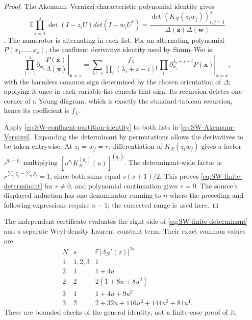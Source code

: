 \begin{proof}
The Akemann--Vernizzi characteristic-polynomial identity gives
\begin{equation}
 \mathbb E\prod_{i=1}^{s}\det(I-z_iU)det(I-w_iU^*)
 =\frac{\det(K_N(z_iw_j))_{i,j=1}^{s}}
 {\Delta(\mathbf z)\Delta(\mathbf w)}
 \label{eq:SW-Akemann-Vernizzi}
\end{equation}
\cite[Thm.~1]{akemannVernizzi2003}.  The numerator is alternating in each list.  For an
alternating polynomial $P(x_1,\ldots,x_s)$, the confluent derivative identity used by
Simm--Wei is
\begin{equation}
 \left.\prod_{i=1}^{s}\partial_{x_i}\frac{P(\mathbf x)}{\Delta(\mathbf x)}
 \right|_{\mathbf x=x}
 =\sum_{\lambda\vdash s}
 \frac{f_\lambda}{\prod_i(\lambda_i+s-i)!}
 \left.\prod_i\partial_{x_i}^{\lambda_i+s-i}P(\mathbf x)\right|_{\mathbf x=x},
 \label{eq:SW-confluent-partition-identity}
\end{equation}
with the harmless common sign determined by the chosen orientation of $\Delta$; applying it
once in each variable list cancels that sign.  Its recursion deletes one corner of a Young
diagram, which is exactly the standard-tableau recursion, hence its coefficient is
$f_\lambda$.

Apply \eqref{eq:SW-confluent-partition-identity} to both lists in
\eqref{eq:SW-Akemann-Vernizzi}.  Expanding the determinant by permutations allows the
derivatives to be taken entrywise.  At $z_i=w_j=r$, differentiation of
$K_N(z_iw_j)$ gives a factor $r^{q_j-p_i}$ multiplying
$[u^{p_i}K_N^{(p_i)}(u)]^{(q_j)}$.  The determinant-wide factor is
$r^{\sum_jq_j-\sum_ip_i}=1$, since both sums equal $s(s+1)/2$.  This proves
\eqref{eq:SW-finite-determinant} for $r\ne0$, and polynomial continuation gives $r=0$.
The source's displayed induction has one denominator running to $n$ where the preceding and
following expressions require $n-1$; the corrected range is used here.
\end{proof}

The independent certificate evaluates the right side of
\eqref{eq:SW-finite-determinant} and a separate Weyl-density Laurent constant term.  Their
exact common values are
\begin{equation}
\begin{array}{c|c|l}
N&s&\mathbb E|\Lambda_N'(z)|^{2s}\\ \hline
1&1,2,3&1\\
2&1&1+4u\\
2&2&2(1+8u+8u^2)\\
3&1&1+4u+9u^2\\
3&2&2+32u+116u^2+144u^3+81u^4.
\end{array}
\label{eq:SW-certificate-table}
\end{equation}
These are bounded checks of the general identity, not a finite-case proof of it.

